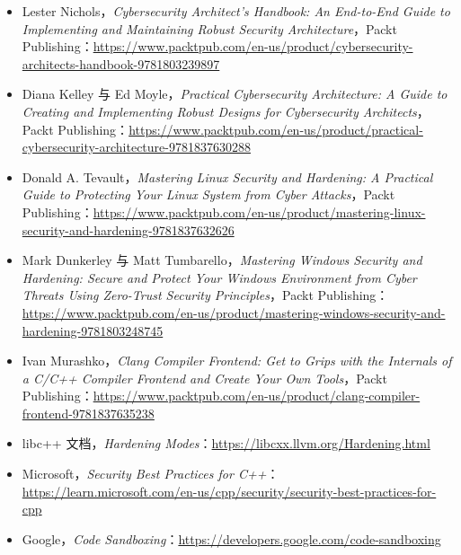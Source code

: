 \begin{itemize}
\item Lester Nichols，\emph{Cybersecurity Architect’s Handbook: An End-to-End Guide to Implementing and Maintaining Robust Security Architecture}，Packt Publishing：\href{https://www.packtpub.com/en-us/product/cybersecurity-architects-handbook-9781803239897}{https://www.packtpub.com/en-us/product/cybersecurity-architects-handbook-9781803239897}
\item Diana Kelley 与 Ed Moyle，\emph{Practical Cybersecurity Architecture: A Guide to Creating and Implementing Robust Designs for Cybersecurity Architects}，Packt Publishing：\href{https://www.packtpub.com/en-us/product/practical-cybersecurity-architecture-9781837630288}{https://www.packtpub.com/en-us/product/practical-cybersecurity-architecture-9781837630288}
\item Donald A. Tevault，\emph{Mastering Linux Security and Hardening: A Practical Guide to Protecting Your Linux System from Cyber Attacks}，Packt Publishing：\href{https://www.packtpub.com/en-us/product/mastering-linux-security-and-hardening-9781837632626}{https://www.packtpub.com/en-us/product/mastering-linux-security-and-hardening-9781837632626}
\item Mark Dunkerley 与 Matt Tumbarello，\emph{Mastering Windows Security and Hardening: Secure and Protect Your Windows Environment from Cyber Threats Using Zero-Trust Security Principles}，Packt Publishing：\href{https://www.packtpub.com/en-us/product/mastering-windows-security-and-hardening-9781803248745}{https://www.packtpub.com/en-us/product/mastering-windows-security-and-hardening-9781803248745}
\item Ivan Murashko，\emph{Clang Compiler Frontend: Get to Grips with the Internals of a C/C++ Compiler Frontend and Create Your Own Tools}，Packt Publishing：\href{https://www.packtpub.com/en-us/product/clang-compiler-frontend-9781837635238}{https://www.packtpub.com/en-us/product/clang-compiler-frontend-9781837635238}
\item libc++ 文档，\emph{Hardening Modes}：\href{https://libcxx.llvm.org/Hardening.html}{https://libcxx.llvm.org/Hardening.html}
\item Microsoft，\emph{Security Best Practices for C++}：\href{https://learn.microsoft.com/en-us/cpp/security/security-best-practices-for-cpp }{https://learn.microsoft.com/en-us/cpp/security/security-best-practices-for-cpp}
\item Google，\emph{Code Sandboxing}：\href{https://developers.google.com/code-sandboxing}{https://developers.google.com/code-sandboxing}

\end{itemize}
